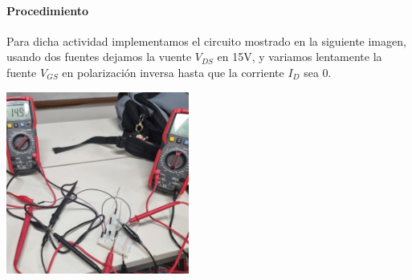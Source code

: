 \paragraph{Procedimiento}

Para dicha actividad implementamos el circuito mostrado en la siguiente imagen, usando dos fuentes dejamos la vuente $V_{DS}$ en 15V, y variamos lentamente la fuente $V_{GS}$ en polarización inversa hasta que la corriente $I_D$ sea 0.

\includegraphics[width=6cm]{./imagenes/Lab2.jpg}

\begin{table}[ht]
\end{table}